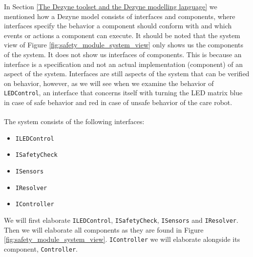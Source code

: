 \documentclass[12pt]{scrreprt}
\begin{document}
\par
In Section \ref{The Dezyne toolset and the Dezyne modelling language} we mentioned how a Dezyne model consists of interfaces and components, where interfaces specify the behavior a component should conform with and which events or actions a component can execute. It should be noted that the system view of Figure \ref{fig:safety_module_system_view} only shows us the components of the system. It does not show us interfaces of components. This is because an interface is a specification and not an actual implementation (component) of an aspect of the system. Interfaces are still aspects of the system that can be verified on behavior, however, as we will see when we examine the behavior of \texttt{LEDControl}, an interface that concerns itself with turning the LED matrix blue in case of safe behavior and red in case of unsafe behavior of the care robot.
\\\\
The system consists of the following interfaces:

\begin{itemize}
    \item \texttt{ILEDControl}
    \item \texttt{ISafetyCheck}
    \item \texttt{ISensors}
    \item \texttt{IResolver}
    \item \texttt{IController}
\end{itemize}

We will first elaborate \texttt{ILEDControl}, \texttt{ISafetyCheck}, \texttt{ISensors} and \texttt{IResolver}. Then we will elaborate all components as they are found in Figure \ref{fig:safety_module_system_view}. \texttt{IController} we will elaborate alongside its component, \texttt{Controller}.
\end{document}
